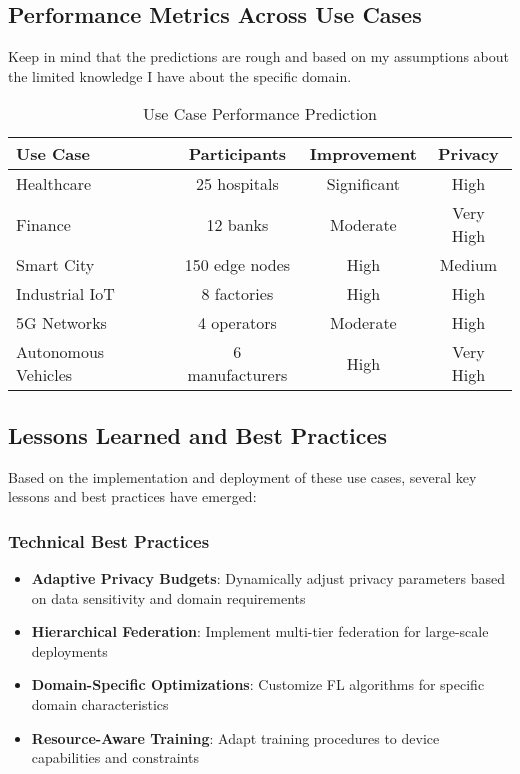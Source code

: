 \subsection{Performance Metrics Across Use Cases}
Keep in mind that the predictions are rough and based on my assumptions about the limited knowledge I have about the specific domain.
\begin{table}[htbp]
\centering
\caption{Use Case Performance Prediction}
\label{tab:use-case-performance}
\begin{tabular}{|l|c|c|c|}
\hline
\textbf{Use Case} & \textbf{Participants} & \textbf{Improvement} & \textbf{Privacy} \\
\hline
Healthcare & 25 hospitals & Significant & High \\
\hline
Finance & 12 banks & Moderate & Very High\\
\hline
Smart City & 150 edge nodes & High & Medium\\
\hline
Industrial IoT & 8 factories & High & High \\
\hline
5G Networks & 4 operators & Moderate & High \\
\hline
Autonomous Vehicles & 6 manufacturers & High & Very High \\
\hline
\end{tabular}
\end{table}

\subsection{Lessons Learned and Best Practices}

Based on the implementation and deployment of these use cases, several key lessons and best practices have emerged:

\subsubsection{Technical Best Practices}
\begin{itemize}
    \item \textbf{Adaptive Privacy Budgets}: Dynamically adjust privacy parameters based on data sensitivity and domain requirements
    \item \textbf{Hierarchical Federation}: Implement multi-tier federation for large-scale deployments
    \item \textbf{Domain-Specific Optimizations}: Customize FL algorithms for specific domain characteristics
    \item \textbf{Resource-Aware Training}: Adapt training procedures to device capabilities and constraints
\end{itemize}


